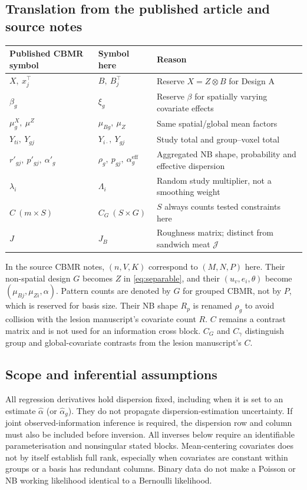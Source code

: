 \documentclass[11pt,a4paper]{article}
\numberwithin{equation}{section}
\begin{document}
\subsection{Translation from the published article and source notes}
\begin{center}\small
\begin{tabularx}{\textwidth}{llT}
\toprule
Published CBMR symbol & Symbol here & Reason\\
\midrule
$X,\ x_j^\top$ & $B,\ B_j^\top$ & Reserve $X=Z\otimes B$ for Design A\\
$\beta_g$ & $\xi_g$ & Reserve $\beta$ for spatially varying covariate effects\\
$\mu_g^X,\ \mu^Z$ & $\mu_{Bg},\ \mu_Z$ & Same spatial/global mean factors\\
$Y_{ti},\ Y_{gj}$ & $Y_{i\cdot},\ Y_{gj}$ & Study total and group--voxel total\\
$r'_{gj},\ p'_{gj},\ \alpha'_g$ & $\rho_g,\ p_{gj},\ \alpha_g^{\mathrm{eff}}$ &
Aggregated NB shape, probability and effective dispersion\\
$\lambda_i$ & $\Lambda_i$ & Random study multiplier, not a smoothing weight\\
$C\ (m\times S)$ & $C_G\ (S\times G)$ &
$S$ always counts tested constraints here\\
$J$ & $J_B$ & Roughness matrix; distinct from sandwich meat $\mathcal J$\\
\bottomrule
\end{tabularx}
\end{center}
In the source CBMR notes, $(n,V,K)$ correspond to $(M,N,P)$ here. Their
non-spatial design $G$ becomes $Z$ in \eqref{eq:separable}, and their
$(u_v,e_i,\theta)$ become $(\mu_{Bj},\mu_{Zi},\alpha)$. Pattern counts are
denoted by $G$ for grouped CBMR, not by $P$, which is reserved
for basis size. Their NB shape $R_p$ is renamed $\rho_g$ to avoid collision
with the lesion manuscript's covariate count $R$. $C$ remains a contrast matrix and is
not used for an information cross block. $C_G$ and $C_\gamma$ distinguish
group and global-covariate contrasts from the lesion manuscript's $C$.

\subsection{Scope and inferential assumptions}
All regression derivatives hold dispersion fixed, including when it is set to
an estimate $\widehat\alpha$ (or $\widehat\alpha_g$). They do not propagate dispersion-estimation
uncertainty. If joint observed-information inference is required, the
dispersion row and column must also be included before inversion. All inverses
below require an identifiable parameterisation and nonsingular stated blocks.
Mean-centering covariates does not by itself establish full rank, especially
when covariates are constant within groups or a basis has redundant columns.
Binary data do not make a Poisson or NB working likelihood identical to a
Bernoulli likelihood.
\end{document}
